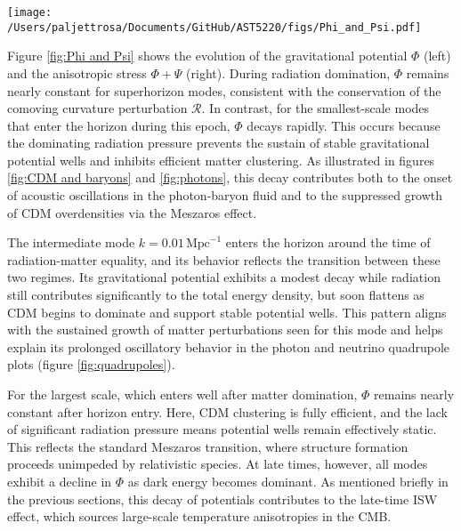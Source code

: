 \documentclass{aa}
\numberwithin{equation}{section}
\numberwithin{table}{section}
\numberwithin{figure}{section}
\begin{document}
\begin{figure*}
  \centering
  \texttt{[image: /Users/paljettrosa/Documents/GitHub/AST5220/figs/Phi\_and\_Psi.pdf]}
  \caption{Evolution of the gravitational potential $\Phi$ (left) and the anisotropic stress $\Phi + \Psi$ (right). 
  Small-scale modes that enter the horizon during radiation domination exhibit decaying $\Phi$ and oscillatory $\Phi + \Psi$, while large-scale modes preserve nearly constant potentials until dark energy domination.
  }\label{fig:Phi and Psi}
\end{figure*}

Figure \ref{fig:Phi and Psi} shows the evolution of the gravitational potential $\Phi$ (left) and the anisotropic stress $\Phi + \Psi$ (right). During radiation domination, $\Phi$ remains nearly constant for superhorizon modes, consistent with the conservation of the comoving curvature perturbation $\mathcal{R}$. In contrast, for the smallest-scale modes that enter the horizon during this epoch, $\Phi$ decays rapidly. This occurs because the dominating radiation pressure prevents the sustain of stable gravitational potential wells and inhibits efficient matter clustering. As illustrated in figures \ref{fig:CDM and baryons} and \ref{fig:photons}, this decay contributes both to the onset of acoustic oscillations in the photon-baryon fluid and to the suppressed growth of CDM overdensities via the Meszaros effect.

The intermediate mode $k = 0.01\,\text{Mpc}^{-1}$ enters the horizon around the time of radiation-matter equality, and its behavior reflects the transition between these two regimes. Its gravitational potential exhibits a modest decay while radiation still contributes significantly to the total energy density, but soon flattens as CDM begins to dominate and support stable potential wells. This pattern aligns with the sustained growth of matter perturbations seen for this mode and helps explain its prolonged oscillatory behavior in the photon and neutrino quadrupole plots (figure \ref{fig:quadrupoles}).

For the largest scale, which enters well after matter domination, $\Phi$ remains nearly constant after horizon entry. Here, CDM clustering is fully efficient, and the lack of significant radiation pressure means potential wells remain effectively static. This reflects the standard Meszaros transition, where structure formation proceeds unimpeded by relativistic species. At late times, however, all modes exhibit a decline in $\Phi$ as dark energy becomes dominant. As mentioned briefly in the previous sections, this decay of potentials contributes to the late-time ISW effect, which sources large-scale temperature anisotropies in the CMB.
\end{document}
